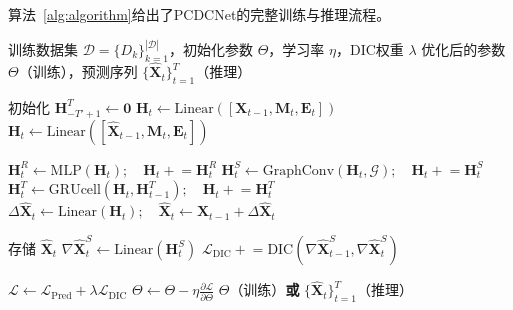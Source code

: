 算法~\ref{alg:algorithm}给出了PCDCNet的完整训练与推理流程。

\begin{algorithm}[htbp]
\caption{PCDCNet 模型训练与推理流程}
\caption*{\textbf{PCDCNet}：算法包含历史编码和预测两个阶段。每个时间步依次执行：嵌入层融合多源数据、LID模块处理局地化学反应、STD模块处理空间传输、TAD模块处理时间累积、残差预测生成浓度。训练时同时优化预测损失和DIC约束损失。}
\label{alg:algorithm}
\begin{algorithmic}[1]
    \REQUIRE 训练数据集 $\mathcal{D} = \{D_k\}_{k=1}^{|\mathcal{D}|}$，初始化参数 $\Theta$，学习率 $\eta$，DIC权重 $\lambda$
    \ENSURE 优化后的参数 $\Theta$（训练），预测序列 $\{\hat{\mathbf{X}}_t\}_{t=1}^T$（推理）

        \STATE 初始化 $\mathbf{H}_{-T'+1}^T \leftarrow \mathbf{0}$ 
                \STATE $\mathbf{H}_t \leftarrow \text{Linear}([\mathbf{X}_{t-1}, \mathbf{M}_t, \mathbf{E}_t])$ 
            \ELSE
                \STATE $\mathbf{H}_t \leftarrow \text{Linear}([\hat{\mathbf{X}}_{t-1}, \mathbf{M}_t, \mathbf{E}_t])$ 
            \ENDIF

            \STATE $\mathbf{H}_t^R \leftarrow \text{MLP}(\mathbf{H}_t); \quad \mathbf{H}_t \mathrel{+}= \mathbf{H}_t^R$ 
            \STATE $\mathbf{H}_t^S \leftarrow \text{GraphConv}(\mathbf{H}_t, \mathcal{G}); \quad \mathbf{H}_t \mathrel{+}= \mathbf{H}_t^S$ 
            \STATE $\mathbf{H}_t^T \leftarrow \text{GRUcell}(\mathbf{H}_t, \mathbf{H}_{t-1}^T); \quad \mathbf{H}_t \mathrel{+}= \mathbf{H}_t^T$ 
            \STATE $\Delta \hat{\mathbf{X}}_{t} \leftarrow \text{Linear}(\mathbf{H}_t); \quad \hat{\mathbf{X}}_{t} \leftarrow \hat{\mathbf{X}}_{t-1} + \Delta \hat{\mathbf{X}}_{t}$ 

                \STATE 存储 $\hat{\mathbf{X}}_t$
                \STATE $\nabla \hat{\mathbf{X}}_t^S \leftarrow \text{Linear}(\mathbf{H}_t^S)$ 
                \STATE $\mathcal{L}_{\mathrm{DIC}} \mathrel{+}= \text{DIC}(\nabla \hat{\mathbf{X}}_{t-1}^S, \nabla \hat{\mathbf{X}}_t^S)$ 
            \ENDIF
        \ENDFOR
    \ENDFOR

    \STATE $\mathcal{L} \leftarrow \mathcal{L}_{\mathrm{Pred}} + \lambda \mathcal{L}_{\mathrm{DIC}}$
    \STATE $\Theta \leftarrow \Theta - \eta \frac{\partial \mathcal{L}}{\partial \Theta}$
    \STATE \RETURN $\Theta$（训练）\textbf{或} $\{\hat{\mathbf{X}}_t\}_{t=1}^T$（推理）
\end{algorithmic}
\end{algorithm}



